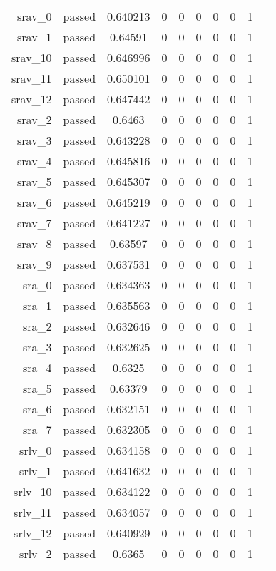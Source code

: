 \begin{longtable}{r|ccccccccc}
    srav\_0 & passed & 0.640213 & 0 & 0 & 0 & 0 & 0 & 1 \\
    srav\_1 & passed & 0.64591 & 0 & 0 & 0 & 0 & 0 & 1 \\
    srav\_10 & passed & 0.646996 & 0 & 0 & 0 & 0 & 0 & 1 \\
    srav\_11 & passed & 0.650101 & 0 & 0 & 0 & 0 & 0 & 1 \\
    srav\_12 & passed & 0.647442 & 0 & 0 & 0 & 0 & 0 & 1 \\
    srav\_2 & passed & 0.6463 & 0 & 0 & 0 & 0 & 0 & 1 \\
    srav\_3 & passed & 0.643228 & 0 & 0 & 0 & 0 & 0 & 1 \\
    srav\_4 & passed & 0.645816 & 0 & 0 & 0 & 0 & 0 & 1 \\
    srav\_5 & passed & 0.645307 & 0 & 0 & 0 & 0 & 0 & 1 \\
    srav\_6 & passed & 0.645219 & 0 & 0 & 0 & 0 & 0 & 1 \\
    srav\_7 & passed & 0.641227 & 0 & 0 & 0 & 0 & 0 & 1 \\
    srav\_8 & passed & 0.63597 & 0 & 0 & 0 & 0 & 0 & 1 \\
    srav\_9 & passed & 0.637531 & 0 & 0 & 0 & 0 & 0 & 1 \\
    sra\_0 & passed & 0.634363 & 0 & 0 & 0 & 0 & 0 & 1 \\
    sra\_1 & passed & 0.635563 & 0 & 0 & 0 & 0 & 0 & 1 \\
    sra\_2 & passed & 0.632646 & 0 & 0 & 0 & 0 & 0 & 1 \\
    sra\_3 & passed & 0.632625 & 0 & 0 & 0 & 0 & 0 & 1 \\
    sra\_4 & passed & 0.6325 & 0 & 0 & 0 & 0 & 0 & 1 \\
    sra\_5 & passed & 0.63379 & 0 & 0 & 0 & 0 & 0 & 1 \\
    sra\_6 & passed & 0.632151 & 0 & 0 & 0 & 0 & 0 & 1 \\
    sra\_7 & passed & 0.632305 & 0 & 0 & 0 & 0 & 0 & 1 \\
    srlv\_0 & passed & 0.634158 & 0 & 0 & 0 & 0 & 0 & 1 \\
    srlv\_1 & passed & 0.641632 & 0 & 0 & 0 & 0 & 0 & 1 \\
    srlv\_10 & passed & 0.634122 & 0 & 0 & 0 & 0 & 0 & 1 \\
    srlv\_11 & passed & 0.634057 & 0 & 0 & 0 & 0 & 0 & 1 \\
    srlv\_12 & passed & 0.640929 & 0 & 0 & 0 & 0 & 0 & 1 \\
    srlv\_2 & passed & 0.6365 & 0 & 0 & 0 & 0 & 0 & 1 \\

\end{longtable}
